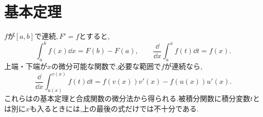 \section{基本定理}
$f$が$[a,b]$で連続,\,$F'=f$とすると,
\[
 \int_a^b f(x)\dd x=F(b)-F(a),\qquad
 \frac{\dd}{\dd x}\int_a^x f(t)\dd t=f(x).
\]
上端・下端が$x$の微分可能な関数で,必要な範囲で$f$が連続なら,
\[
 \frac{\dd}{\dd x}\int_{u(x)}^{v(x)}f(t)\dd t
 =f(v(x))v'(x)-f(u(x))u'(x).
\]
これらはの基本定理と合成関数の微分法から得られる.被積分関数に積分変数$t$とは別に$x$も入るときには,上の最後の式だけでは不十分である.


